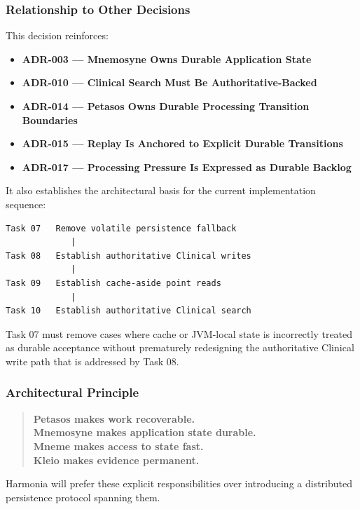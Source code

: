 \subsubsection{Relationship to Other Decisions}

This decision reinforces:
\begin{itemize}
    \item \textbf{ADR-003 --- Mnemosyne Owns Durable Application State}
    \item \textbf{ADR-010 --- Clinical Search Must Be Authoritative-Backed}
    \item \textbf{ADR-014 --- Petasos Owns Durable Processing Transition Boundaries}
    \item \textbf{ADR-015 --- Replay Is Anchored to Explicit Durable Transitions}
    \item \textbf{ADR-017 --- Processing Pressure Is Expressed as Durable Backlog}
\end{itemize}

It also establishes the architectural basis for the current implementation sequence:

\begin{verbatim}
Task 07   Remove volatile persistence fallback
             |
Task 08   Establish authoritative Clinical writes
             |
Task 09   Establish cache-aside point reads
             |
Task 10   Establish authoritative Clinical search
\end{verbatim}

Task 07 must remove cases where cache or JVM-local state is incorrectly treated as durable acceptance without prematurely redesigning the authoritative Clinical write path that is addressed by Task 08.

\subsubsection{Architectural Principle}

\begin{quote}
    \textbf{Petasos makes work recoverable.}\\
    \textbf{Mnemosyne makes application state durable.}\\
    \textbf{Mneme makes access to state fast.}\\
    \textbf{Kleio makes evidence permanent.}
\end{quote}

Harmonia will prefer these explicit responsibilities over introducing a distributed persistence protocol spanning them.
